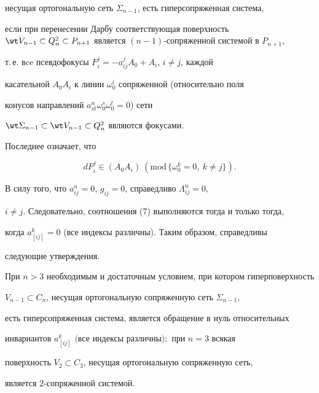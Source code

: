 несущая ортогональную сеть $\Sigma_{n-1}$, есть гиперсопряженная система, 


если при перенесении Дарбу соответствующая поверхность $\wt V_{n-1}\subset 


Q^2_n\subset P_{n+1}$ является $(n-1)$-сопряженной системой в $P_{n+1}$, 


т.\,е. вce псевдофокусы $F^j_i=-a^j_{ij}A_0+A_i$, $i\ne j$, каждой 


касательной $A_0A_i$ к линии $\omega^i_0$ сопряженной (относительно поля 


конусов направлений $a^n_{st}\omega^s_0\omega^t_0=0$) сети 


$\wt\Sigma_{n-1}\subset \wt V_{n-1}\subset Q^2_n$ являются фокусами. 


Последнее означает, что 


\begin{equation} 


dF^j_i\in(A_0A_i)\ (\mathrm{mod}\,\{\omega^k_0=0,\ k\ne j\}). 


\end{equation} 


 


В силу того, что $a^n_{ij}=0$, $g_{ij}=0$, справедливо $\Lambda^n_{ij}=0$, 


$i\ne j$. Следовательно, соотношения (7) выполняются тогда и только тогда, 


когда $a^k_{[ij]}=0$ (все индексы различны). Таким образом, справедливы 


следующие утверждения. 


 


 


\begin{thm} 


При $n>3$ необходимым и достаточным условием, при котором гиперповерхность 


$V_{n-1}\subset C_n$, несущая ортогональную сопряженную сеть $\Sigma_{n-1}$, 


есть гиперсопряженная система, является обращение в нуль относительных 


инвариантов $a^k_{[ij]}$ $($все индексы различны$);$ при $n=3$ всякая 


поверхность $V_2\subset C_3$, несущая ортогональную сопряженную сеть, 


является $2$-сопряженной системой. 


\end{thm} 


